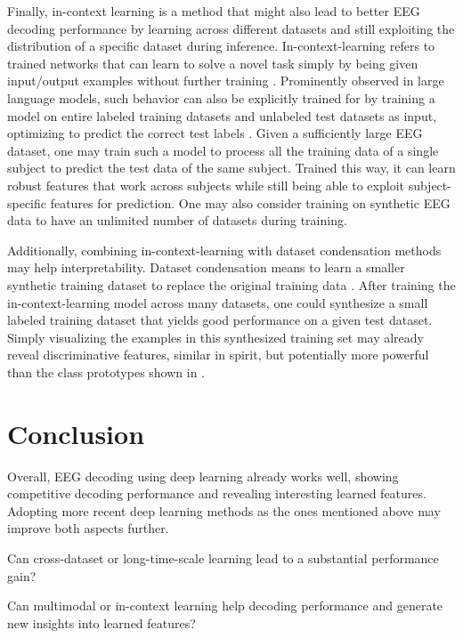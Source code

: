 Finally, in-context learning is a method that might also lead to better
EEG decoding performance by learning across different datasets and still
exploiting the distribution of a specific dataset during inference.
In-context-learning refers to trained networks that can learn to solve a
novel task simply by being given input/output examples without further
training
\citep{DBLP:conf/iclr/XieRL022,DBLP:conf/emnlp/MinLHALHZ22,DBLP:conf/iclr/0005HPGH22}.
Prominently observed in large language models, such behavior can also be
explicitly trained for by training a model on entire labeled training
datasets and unlabeled test datasets as input, optimizing to predict the
correct test labels \citep{DBLP:conf/iclr/0005HPGH22,tabpfn}.
Given a sufficiently large EEG dataset, one may train such a model to
process all the training data of a single subject to predict the test
data of the same subject. Trained this way, it can learn robust features
that work across subjects while still being able to exploit
subject-specific features for prediction. One may also consider training
on synthetic EEG data to have an unlimited number of datasets during
training.

Additionally, combining in-context-learning with dataset condensation
methods may help interpretability. Dataset condensation means to learn a
smaller synthetic training dataset to replace the original training data
\citep{DBLP:conf/icml/MaclaurinDA15,DBLP:conf/iclr/ZhaoMB21,DBLP:conf/icml/ZhaoB21,DBLP:journals/corr/abs-1811-10959}.
After training the in-context-learning model across many datasets, one
could synthesize a small labeled training dataset that yields good
performance on a given test dataset. Simply visualizing the examples in
this synthesized training set may already reveal discriminative
features, similar in spirit, but potentially more powerful than the
class prototypes shown in .

\section{Conclusion}\label{conclusion}

Overall, EEG decoding using deep learning already works well, showing
competitive decoding performance and revealing interesting learned
features. Adopting more recent deep learning methods as the ones
mentioned above may improve both aspects further.


\begin{openbox}
\item Can cross-dataset or long-time-scale learning lead to a substantial performance gain?
\item Can multimodal or in-context learning help decoding performance and generate new insights into learned features?
\end{openbox}
